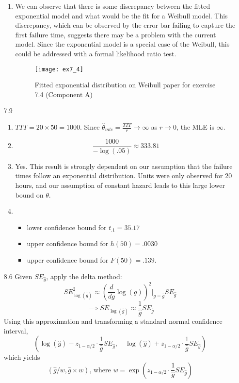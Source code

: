 \documentclass[12pt]{article}\usepackage[]{graphicx}\usepackage[]{color}
\begin{document}
\begin{enumerate}
\begin{enumerate}
  \item
  We can observe that there is some discrepancy between the fitted exponential model and what would be the fit for a Weibull model. This discrepancy, which can be observed by the error bar failing to capture the first failure time, suggests there may be a problem with the current model. Since the exponential model is a special case of the Weibull, this could be addressed with a formal likelihood ratio test.
  
  \begin{figure}
    \texttt{[image: ex7\_4]}
    \caption{Fitted exponential distribution on Weibull paper for exercise 7.4 (Component A)}
  \end{figure}
\end{enumerate}

\item[7.9]
\begin{enumerate}
  \item $TTT = 20\times 50 = 1000$. Since $\widehat{\theta}_{mle} = \frac{TTT}{r} \rightarrow \infty$ as $r \rightarrow 0$, the MLE is $\infty$.
  \item
  \[\frac{1000}{-\log (.05)} \approx 333.81\]
  \item
  Yes. This result is strongly dependent on our assumption that the failure times follow an exponential distribution. Units were only observed for 20 hours, and our assumption of constant hazard leads to this large lower bound on $\theta$.
  \item
  \begin{itemize}
    \item lower confidence bound for $t_{.1} = 35.17$
    \item upper confidence bound for $h(50) = .0030$
    \item
    upper confidence bound for $F(50) = .139$.
  \end{itemize}
\end{enumerate}
\item[8.6]
Given $SE_{\hat{g}}$, apply the delta method:
\[SE_{\log(\hat{g})}^2 \approx \left(\frac{d}{d g}\log(g)\right)^2\bigg|_{g = \hat{g}}SE_{\hat{g}}\]
\[\implies SE_{\log(\hat{g})} \approx \frac{1}{\hat{g}}SE_{\hat{g}}\]
Using this approximation and transforming a standard normal confidence interval,
\[(\log(\hat{g}) - z_{1-\alpha/2}\cdot \frac{1}{\hat{g}}SE_{\hat{g}}, \quad \log(\hat{g}) + z_{1-\alpha/2}\cdot \frac{1}{\hat{g}}SE_{\hat{g}})\]
which yields
\[(\hat{g}/w, \hat{g}\times w) \mbox{, where } w=\exp(z_{1-\alpha/2}\cdot \frac{1}{\hat{g}}SE_{\hat{g}})\]


\end{enumerate}
\end{document}
